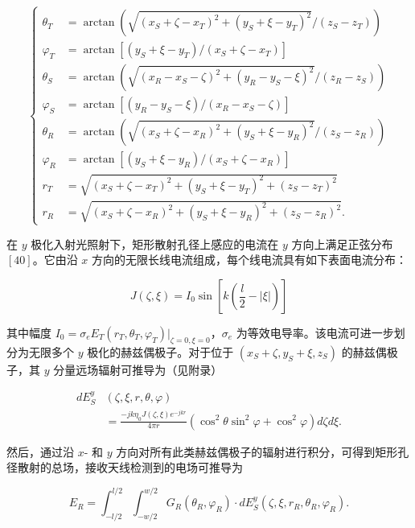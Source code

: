 \begin{TranslationNoMiniToc}
\begin{equation}
\left\{
\begin{aligned}
\theta_T &= \arctan(\sqrt{(x_S+\zeta-x_T)^2+(y_S+\xi-y_T)^2}/(z_S-z_T)) \\
\varphi_T &= \arctan[(y_S+\xi-y_T)/(x_S+\zeta-x_T)] \\
\theta_S &= \arctan(\sqrt{(x_R-x_S-\zeta)^2+(y_R-y_S-\xi)^2}/(z_R-z_S)) \\
\varphi_S &= \arctan[(y_R-y_S-\xi)/(x_R-x_S-\zeta)] \\
\theta_R &= \arctan(\sqrt{(x_S+\zeta-x_R)^2+(y_S+\xi-y_R)^2}/(z_S-z_R)) \\
\varphi_R &= \arctan[(y_S+\xi-y_R)/(x_S+\zeta-x_R)] \\
r_T &= \sqrt{(x_S+\zeta-x_T)^2+(y_S+\xi-y_T)^2+(z_S-z_T)^2} \\
r_R &= \sqrt{(x_S+\zeta-x_R)^2+(y_S+\xi-y_R)^2+(z_S-z_R)^2}.
\end{aligned}
\right.
\end{equation}

在 $y$ 极化入射光照射下，矩形散射孔径上感应的电流在 $y$ 方向上满足正弦分布 $[40]$。它由沿 $x$ 方向的无限长线电流组成，每个线电流具有如下表面电流分布：

\begin{equation}
J(\zeta, \xi) = I_0 \sin \left[ k \left( \frac{l}{2} - |\xi| \right) \right]
\end{equation}

其中幅度 $I_0 = \sigma_e E_T(r_T, \theta_T, \varphi_T)|_{\zeta=0, \xi=0}$，$\sigma_e$ 为等效电导率。该电流可进一步划分为无限多个 $y$ 极化的赫兹偶极子。对于位于 $(x_S + \zeta, y_S + \xi, z_S)$ 的赫兹偶极子，其 $y$ 分量远场辐射可推导为（见附录）

\begin{equation}
\begin{aligned}
d E_S^y &(\zeta, \xi, r, \theta, \varphi) \\
&= \frac{-j k \eta_0 J(\zeta, \xi) e^{-jkr}}{4 \pi r} (\cos^2 \theta \sin^2 \varphi + \cos^2 \varphi) d\zeta d\xi.
\end{aligned}
\end{equation}

然后，通过沿 $x$- 和 $y$ 方向对所有此类赫兹偶极子的辐射进行积分，可得到矩形孔径散射的总场，接收天线检测到的电场可推导为

\begin{equation}
E_R = \int_{-l/2}^{l/2} \int_{-w/2}^{w/2} G_R(\theta_R, \varphi_R) \cdot d E_S^y(\zeta, \xi, r_R, \theta_R, \varphi_R).
\end{equation}


\end{TranslationNoMiniToc}
